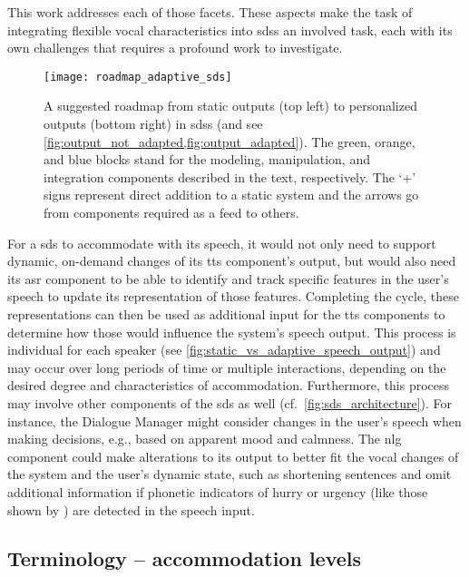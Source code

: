 This work addresses each of those facets.
These aspects make the task of integrating flexible vocal characteristics into \acp{sds} an involved task, each with its own challenges that requires a profound work to investigate.
%
\begin{figure}[t]
	\centering
	\texttt{[image: roadmap\_adaptive\_sds]}
	\caption[Roadmap to phonetically adaptive \acl{sds}]
		{A suggested roadmap from static outputs (top left) to personalized outputs (bottom right) in \acp{sds} (and see \cref{fig:output_not_adapted,fig:output_adapted}).
		The green, orange, and blue blocks stand for the modeling, manipulation, and integration components described in the text, respectively.
		The \enquote*{+} signs represent direct addition to a static system and the arrows go from components required as a feed to others.}
	\label{fig:roadmap_adaptive_sds}
\end{figure}
%
For a \ac{sds} to accommodate with its speech, it would not only need to support dynamic, on-demand changes of its \ac{tts} component's output, but would also need its \ac{asr} component to be able to identify and track specific features in the user's speech to update its representation of those features.
Completing the cycle, these representations can then be used as additional input for the \ac{tts} components to determine how those would influence the system's speech output.
This process is individual for each speaker (see \cref{fig:static_vs_adaptive_speech_output}) and may occur over long periods of time or multiple interactions, depending on the desired degree and characteristics of accommodation.
Furthermore, this process may involve other components of the \ac{sds} as well (cf.\ \cref{fig:sds_architecture}).
For instance, the Dialogue Manager might consider changes in the user's speech when making decisions, e.g., based on apparent mood and calmness.
The \ac{nlg} component could make alterations to its output to better fit the vocal changes of the system and the user's dynamic state, such as shortening sentences and omit additional information if phonetic indicators of hurry or urgency (like those shown by \citet{Edworthy2003acoustic}) are detected in the speech input.

\subsection{Terminology -- accommodation levels}
\label{subsec:accommodation_levels}

